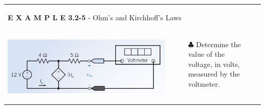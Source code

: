 \documentclass[aspectratio=169]{beamer}
\begin{document}
\begin{frame}[fragile]
\begin{tabular}{ll}
\begin{columns}[c]
				\textbf{E X A M P L E 3.2-5} -  Ohm’s and Kirchhoff’s Laws
			\end{columns}	
		 \\
			\begin{columns}
				\begin{column}{0.5\textwidth}  %
    					\begin{center}	
     						\includegraphics[width=1\textwidth]{figura5.JPG}
     					\end{center}	
				\end{column}
				\begin{column}{0.5\textwidth}  %
					\begin{itemize}
						\item[$\clubsuit$] Determine the value of the voltage, in volts, measured by the voltmeter.
					\end{itemize}
				\end{column}
			\end{columns}	
		
   		\end{tabular}
\end{frame}
\end{document}

